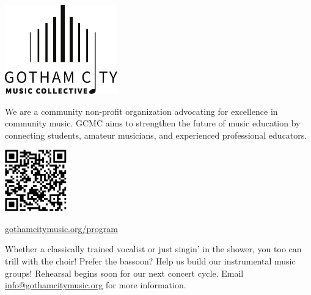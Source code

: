 \documentclass{article}[10pt]
\newcommand{\logo}{
    {\includegraphics[width=0.365\textwidth]{../../graphic_design_assets/bw_logo_full}}
}
\newcommand{\tunedspace}{\vspace{0.2in}}
\begin{document}
\begin{center}
\pagebreak


{\logo}

\tunedspace

\begin{minipage}{4in}

    
\begin{small}
We are a community non-profit organization advocating for excellence in community music.
GCMC aims to strengthen the future of music education by connecting students, amateur musicians, and experienced professional educators.
\end{small}

\begin{center}
    {\textbf{}}

    \vspace{0.1in}

    {\includegraphics[width=0.2\textwidth]{../../graphic_design_assets/gotham_city_music_collective_program}}

    \href{https://gothamcitymusic.org/program}{gothamcitymusic.org/program}
\end{center}

\begin{center}
{\textbf{}}
\end{center}

\vspace{-0.1in}

\begin{small}
Whether a classically trained vocalist or just singin' in the shower,
you too can trill with the choir!
Prefer the bassoon?
Help us build our instrumental music groups!
Rehearsal begins soon for our next concert cycle.
Email \href{info@gothamcitymusic.org}{info@gothamcitymusic.org} for more information.
\end{small}

\begin{center}
{\textbf{}}
\end{center}

\vspace{-0.1in}


\end{minipage}
\end{center}
\end{document}
